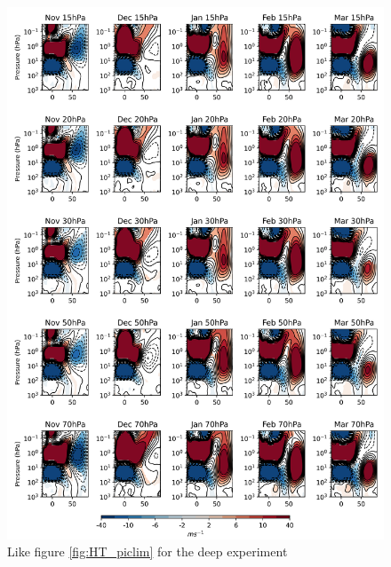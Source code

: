 \begin{figure}[h!]
\begin{center}
\noindent\includegraphics[width = 0.9\linewidth]{Figures/Figures-deepQBO/ZMZW_composites_by_month_QBO_phases_U_d_higher_MarQBO_vs_Mar_70hPa_5thresh.png}
\caption[]{Like figure \ref{fig:HT_piclim} for the deep experiment}
\label{fig:HT_deep}
\end{center}
\end{figure}

